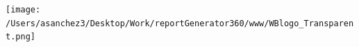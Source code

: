 \documentclass{article}\usepackage[]{graphicx}\usepackage[]{color}
\begin{document}
\begin{minipage}[c]{0.95\textwidth}
\begin{minipage}[c]{0.55\textwidth}
  \hspace{4ex}\scriptsize{\href{NA}{\textcolor[HTML]{FF4023}{}}}
  \end{minipage}
\end{minipage}

  \vspace{4ex}
  \begin{minipage}[c]{0.33\textwidth}
    \hspace*{+0.3cm} \texttt{[image: /Users/asanchez3/Desktop/Work/reportGenerator360/www/WBlogo\_Transparent.png]}
  \end{minipage}
  \begin{minipage}[c]{0.60\textwidth}
    \vspace*{-0.1cm}
  \end{minipage}
\end{document}
